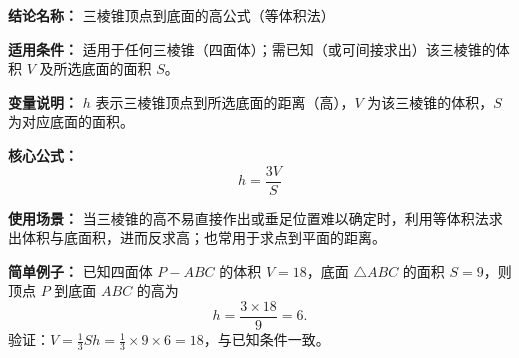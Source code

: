 \textbf{结论名称：} 三棱锥顶点到底面的高公式（等体积法）

\textbf{适用条件：} 适用于任何三棱锥（四面体）；需已知（或可间接求出）该三棱锥的体积 \(V\) 及所选底面的面积 \(S\)。

\textbf{变量说明：} \(h\) 表示三棱锥顶点到所选底面的距离（高），\(V\) 为该三棱锥的体积，\(S\) 为对应底面的面积。

\textbf{核心公式：} \[ \boxed{h = \frac{3V}{S}} \]

\textbf{使用场景：} 当三棱锥的高不易直接作出或垂足位置难以确定时，利用等体积法求出体积与底面积，进而反求高；也常用于求点到平面的距离。

\textbf{简单例子：} 已知四面体 \(P-ABC\) 的体积 \(V = 18\)，底面 \(\triangle ABC\) 的面积 \(S = 9\)，则顶点 \(P\) 到底面 \(ABC\) 的高为
\[ h = \frac{3 \times 18}{9} = 6. \]
验证：\(V = \frac{1}{3}Sh = \frac{1}{3}\times 9 \times 6 = 18\)，与已知条件一致。